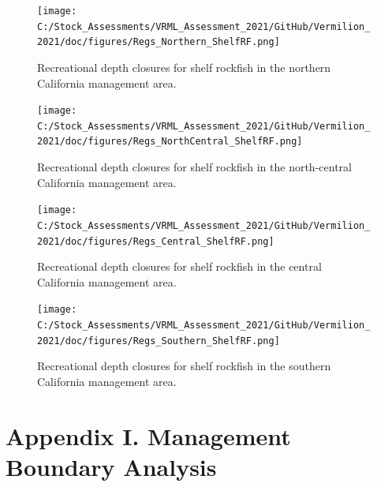 \documentclass[11pt,
  english,
]{article}
\begin{document}
\leavevmode\tagmcend\tagstructend

\renewcommand{\thepage}{H\arabic{page}}
\renewcommand{\thefigure}{H\arabic{figure}}
\renewcommand{\thetable}{H\arabic{table}}
\setcounter{page}{1}
\setcounter{figure}{0}
\setcounter{table}{0}

\clearpage

\begin{landscape}


\begin{figure}
\texttt{[image: C:/Stock\_Assessments/VRML\_Assessment\_2021/GitHub/Vermilion\_2021/doc/figures/Regs\_Northern\_ShelfRF.png]}
\caption{Recreational depth closures for shelf rockfish in the northern California management area.\label{fig:rec-reg-n}}
\end{figure}

\FloatBarrier

\begin{figure}
\texttt{[image: C:/Stock\_Assessments/VRML\_Assessment\_2021/GitHub/Vermilion\_2021/doc/figures/Regs\_NorthCentral\_ShelfRF.png]}
\caption{Recreational depth closures for shelf rockfish in the north-central California management area.\label{fig:rec-reg-cn}}
\end{figure}

\FloatBarrier

\begin{figure}
\texttt{[image: C:/Stock\_Assessments/VRML\_Assessment\_2021/GitHub/Vermilion\_2021/doc/figures/Regs\_Central\_ShelfRF.png]}
\caption{Recreational depth closures for shelf rockfish in the central California management area.\label{fig:rec-reg-cs}}
\end{figure}


\begin{figure}
\texttt{[image: C:/Stock\_Assessments/VRML\_Assessment\_2021/GitHub/Vermilion\_2021/doc/figures/Regs\_Southern\_ShelfRF.png]}
\caption{Recreational depth closures for shelf rockfish in the southern California management area.\label{fig:rec-reg-s}}
\end{figure}


\end{landscape}

\clearpage

\newpage


\hypertarget{appendix-i.-management-boundary-analysis}{%
\section*{Appendix I. Management Boundary Analysis}\label{appendix-i.-management-boundary-analysis}}
\end{document}
